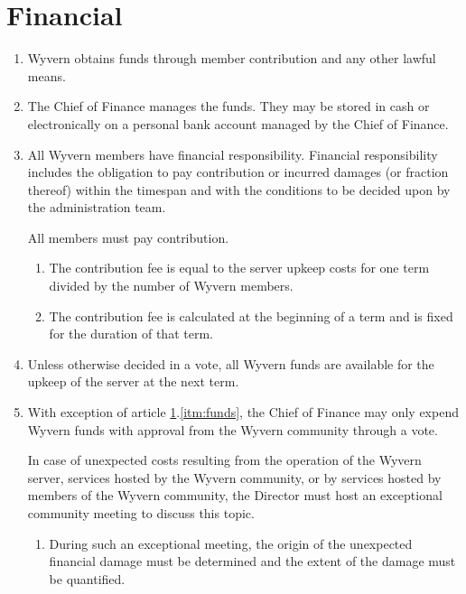 \section{Financial}
\label{sec:financial}

\begin{enumerate}
    \item Wyvern obtains funds through member contribution and any other lawful means.

    \item The Chief of Finance manages the funds. They may be stored in cash or electronically on a personal bank account managed by the Chief of Finance.

    \item All Wyvern members have financial responsibility. Financial responsibility includes the obligation to pay contribution or incurred damages (or fraction thereof) within the timespan and with the conditions to be decided upon by the administration team.

    \begin{item}
        All members must pay contribution.
        \begin{enumerate}
            \item The contribution fee is equal to the server upkeep costs for one term divided by the number of Wyvern members.
            \item The contribution fee is calculated at the beginning of a term and is fixed for the duration of that term.
        \end{enumerate}
    \end{item}

    \item \label{itm:funds} Unless otherwise decided in a vote, all Wyvern funds are available for the upkeep of the server at the next term.

    \item With exception of article \ref{sec:financial}.\ref{itm:funds}, the Chief of Finance may only expend Wyvern funds with approval from the Wyvern community through a vote.

    \begin{item}
         In case of unexpected costs resulting from the operation of the Wyvern server, services hosted by the Wyvern community, or by services hosted by members of the Wyvern community, the Director must host an exceptional community meeting to discuss this topic.
        
        \begin{enumerate}
            \item During such an exceptional meeting, the origin of the unexpected financial damage must be determined and the extent of the damage must be quantified.


\end{enumerate}
\end{item}
\end{enumerate}
